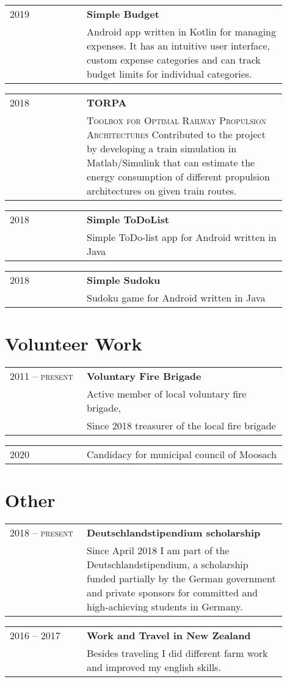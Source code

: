 \documentclass[a4paper, ]{article}
\newenvironment{cventry}[2]
{   
    \setlength{\tabcolsep}{1.25em}
    \hypersetup{urlcolor=black}
    \begin{center}\hspace{-1.25cm}\begin{tabular}{p{0.25\linewidth}|p{0.65\linewidth}}
    \raggedleft\scshape #1 & \bfseries#2 \vspace{0.1cm}\\ & 
}
{\end{tabular}\end{center}}
\newenvironment{cventrynoheading}[1]
{
    \setlength{\tabcolsep}{1.25em}
    \begin{center}\hspace{-1.25cm}\begin{tabular}{p{0.25\linewidth}|p{0.65\linewidth}}
    \raggedleft\scshape #1 & 
}
{\end{tabular}\end{center}}
\newcommand{\newentryline}{\\&}
\begin{document}
\begin{cventry}{2019}
    {Simple Budget \href{https://github.com/korbi98/Simple-Budget}{\normalfont\faGithub}}
    Android app written in Kotlin for managing expenses. It has an intuitive 
    user interface, custom expense categories and can track budget limits 
    for individual categories.
\end{cventry}

\begin{cventry}{2018}
    {TORPA \href{https://www.researchgate.net/project/TORPA-Toolbox-for-Optimal-Railway-Propulsion-Architectures}{\normalfont\faLink}}
    {\scshape Toolbox for Optimal Railway Propulsion Architectures}
    Contributed to the project by developing a train simulation 
    in Matlab/Simulink that can estimate the energy consumption of 
    different propulsion architectures on given train routes.
\end{cventry}

\begin{cventry}{2018}
    {Simple ToDoList \href{https://github.com/korbi98/Simple-ToDoList}{\normalfont\faGithub}}
    Simple ToDo-list app for Android written in Java
\end{cventry}

\begin{cventry}{2018}
    {Simple Sudoku \href{https://github.com/korbi98/Simple-Sudoku}{\normalfont\faGithub}}
    Sudoku game for Android written in Java
\end{cventry}


\section{Volunteer Work}

\begin{cventry}{2011 -- present}{Voluntary Fire Brigade}
    Active member of local voluntary fire brigade, \newentryline 
    Since 2018 treasurer of the local fire brigade
\end{cventry}

\begin{cventrynoheading}{2020}
    Candidacy for municipal council of Moosach
\end{cventrynoheading}


\section{Other}

\begin{cventry}{2018 -- present} {Deutschlandstipendium scholarship}
    Since April 2018 I am part of the Deutschlandstipendium, a scholarship 
    funded partially by the German government and private sponsors for 
    committed and high-achieving students in Germany.
\end{cventry}

\begin{cventry}{2016 -- 2017}{Work and Travel in New Zealand}
    Besides traveling I did different farm work and improved my english skills.
\end{cventry}
\end{document}
